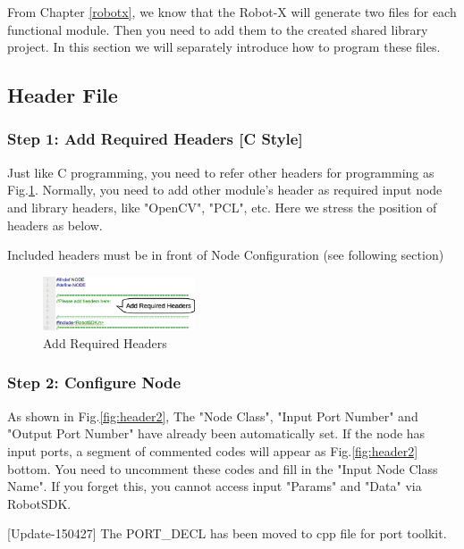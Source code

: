 \documentclass[a4paper,10pt]{book}
\begin{document}
From Chapter \ref{robotx}, we know that the Robot-X will generate two files for each functional module. Then you need to add them to the created shared library project. In this section we will separately introduce how to program these files.

\subsection{Header File}

\subsubsection{Step 1: Add Required Headers [C Style]}

Just like C programming, you need to refer other headers for programming as Fig.\ref{fig:header1}. Normally, you need to add other module's header as required input node and library headers, like "OpenCV", "PCL", etc. Here we stress the position of headers as below.

\begin{framed}
 Included headers must be in front of Node Configuration (see following section)
\end{framed}

\begin{figure}
 \centering
 \includegraphics[width=0.4\textwidth]{img/header1.eps}
 \caption{Add Required Headers}
 \label{fig:header1}
\end{figure}

\subsubsection{Step 2: Configure Node}

As shown in Fig.\ref{fig:header2}, The "Node Class", "Input Port Number" and "Output Port Number" have already been automatically set. If the node has input ports, a segment of commented codes will appear as Fig.\ref{fig:header2} bottom. You need to uncomment these codes and fill in the "Input Node Class Name". If you forget this, you cannot access input "Params" and "Data" via RobotSDK. 

[Update-150427] The PORT\_DECL has been moved to cpp file for port toolkit.
\end{document}
